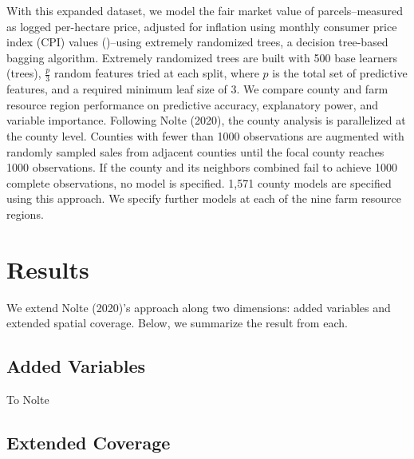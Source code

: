 \documentclass[12pt]{article}
\begin{document}
With this expanded dataset, we model the fair market value of parcels--measured as logged per-hectare price, adjusted for inflation using monthly consumer price index (CPI) values (\cite{blsConsumerPrice})--using extremely randomized trees, a decision tree-based bagging algorithm. Extremely randomized trees are built with 500 base learners (trees), $\frac{p}{3}$ random features tried at each split, where $p$ is the total set of predictive features, and a required minimum leaf size of 3. We compare county and farm resource region performance on predictive accuracy, explanatory power, and variable importance. Following Nolte (2020), the county analysis is parallelized at the county level. Counties with fewer than 1000 observations are augmented with randomly sampled sales from adjacent counties until the focal county reaches 1000 observations. If the county and its neighbors combined fail to achieve 1000 complete observations, no model is specified. 1,571 county models are specified using this approach. We specify further models at each of the nine farm resource regions. 

\newpage

\section{Results}

We extend Nolte (2020)'s approach along two dimensions: added variables and extended spatial coverage. Below, we summarize the result from each.

\subsection{Added Variables}

To Nolte

\subsection{Extended Coverage}


\end{document}
